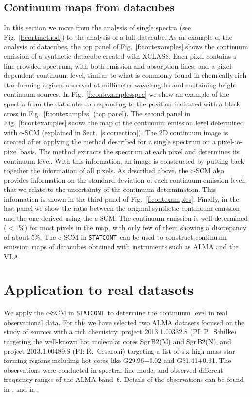 \documentclass{aa}
\newcommand{\statcont} {\texttt{STATCONT}}
\begin{document}
\subsection{Continuum maps from datacubes}\label{s:contdatacube}

In this section we move from the analysis of single spectra (see Fig.~\ref{f:contmethod}) to the analysis of a full datacube. As an example of the analysis of datacubes, the top panel of Fig.~\ref{f:contexamples} shows the continuum emission of a synthetic datacube created with XCLASS. Each pixel contains a line-crowded spectrum, with both emission and absorption lines, and a pixel-dependent continuum level, similar to what is commonly found in chemically-rich star-forming regions observed at millimeter wavelengths and containing bright continuum sources. In Fig.~\ref{f:contexamplesspec} we show an example of the spectra from the datacube corresponding to the position indicated with a black cross in Fig.~\ref{f:contexamples} (top panel). The second panel in Fig.~\ref{f:contexamples} shows the map of the continuum emission level determined with c-SCM (explained in Sect.~\ref{s:correction}). The 2D continuum image is created after applying the method described for a single spectrum on a pixel-to-pixel basis. The method extracts the spectrum at each pixel and determines its continuum level. With this information, an image is constructed by putting back together the information of all pixels. As described above, the c-SCM also provides information on the standard deviation of each continuum emission level, that we relate to the uncertainty of the continuum determination. This information is shown in the third panel of Fig.~\ref{f:contexamples}. Finally, in the last panel we show the ratio between the original synthetic continuum emission and the one derived using the c-SCM. The continuum emission is well determined ($<1$\%) for most pixels in the map, with only few of them showing a discrepancy of about 5\%. The c-SCM in \statcont\ can be used to construct continuum emission maps of datacubes obtained with instruments such as ALMA and the VLA.


\section{Application to real datasets}\label{s:realcases}

We apply the c-SCM in \statcont\ to determine the continuum level in real observational data. For this we have selected two ALMA datasets focused on the study of sources with a rich chemistry: project 2013.1.00332.S (PI: P.\ Schilke) targeting the well-known hot molecular cores Sgr\,B2(M) and Sgr\,B2(N), and project 2013.1.00489.S (PI: R.\ Cesaroni) targeting a list of six high-mass star forming regions including hot cores like G29.96$-$0.02 and G31.41$+$0.31. The observations were conducted in spectral line mode, and observed different frequency ranges of the ALMA band~6. Details of the observations can be found in \citet{Cesaroni2017}, and in \citet{SanchezMonge2017}.
\end{document}
